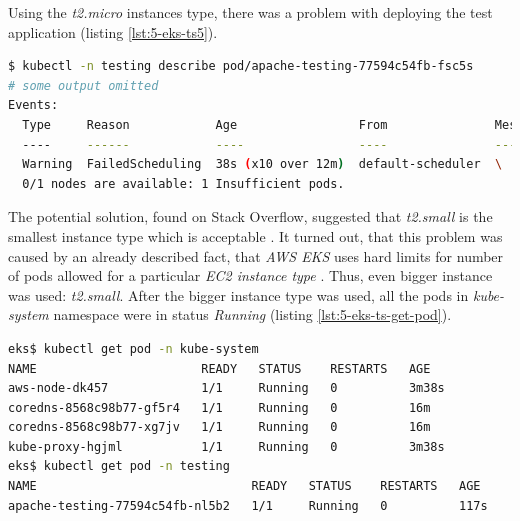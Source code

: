 Using the \textit{t2.micro} instances type, there was a problem with deploying the test application (listing \ref{lst:5-eks-ts5}).
\begin{lstlisting}[basicstyle=\scriptsize,xleftmargin=0cm,label=lst:5-eks-ts5,caption={Debugging a test application},captionpos=b,language=Bash ]
$ kubectl -n testing describe pod/apache-testing-77594c54fb-fsc5s
# some output omitted
Events:
  Type     Reason            Age                 From               Message
  ----     ------            ----                ----               -------
  Warning  FailedScheduling  38s (x10 over 12m)  default-scheduler  \
  0/1 nodes are available: 1 Insufficient pods.
\end{lstlisting}

The potential solution, found on Stack Overflow, suggested that \textit{t2.small} is the smallest instance type which is acceptable \cite{eks-instance-problem-so}. It turned out, that this problem was caused by an already described fact, that \textit{AWS EKS} uses hard limits for number of pods allowed for a particular \textit{EC2 instance type} \cite{eks-hard-limits}. Thus, even bigger instance was used: \textit{t2.small}. After the bigger instance type was used, all the pods in \textit{kube-system} namespace were in status \textit{Running} (listing \ref{lst:5-eks-ts-get-pod}).
\begin{lstlisting}[basicstyle=\scriptsize,xleftmargin=0cm,label=lst:5-eks-ts-get-pod,caption={Verifying that all the pods are running},captionpos=b,language=Bash ]
eks$ kubectl get pod -n kube-system
NAME                       READY   STATUS    RESTARTS   AGE
aws-node-dk457             1/1     Running   0          3m38s
coredns-8568c98b77-gf5r4   1/1     Running   0          16m
coredns-8568c98b77-xg7jv   1/1     Running   0          16m
kube-proxy-hgjml           1/1     Running   0          3m38s
eks$ kubectl get pod -n testing
NAME                              READY   STATUS    RESTARTS   AGE
apache-testing-77594c54fb-nl5b2   1/1     Running   0          117s
\end{lstlisting}


